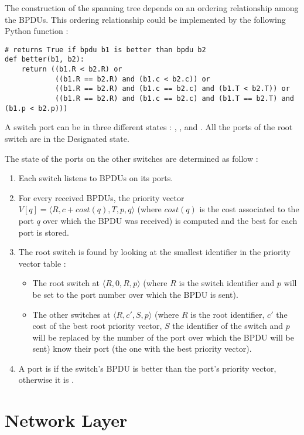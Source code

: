 The construction of the spanning tree depends on an ordering relationship among the BPDUs. This ordering relationship could be implemented by the following Python function :

\begin{verbatim}
# returns True if bpdu b1 is better than bpdu b2
def better(b1, b2):
    return ((b1.R < b2.R) or
            ((b1.R == b2.R) and (b1.c < b2.c)) or
            ((b1.R == b2.R) and (b1.c == b2.c) and (b1.T < b2.T)) or
            ((b1.R == b2.R) and (b1.c == b2.c) and (b1.T == b2.T) and (b1.p < b2.p)))
\end{verbatim}

A switch port can be in three different states : , , and . All the ports of the root switch are in the Designated state.

The state of the ports on the other switches are determined as follow :
\begin{enumerate}
\item Each switch listens to BPDUs on its ports.
\item For every received BPDUs, the priority vector $V[q] = \langle R, c + cost(q), T, p, q \rangle$ (where $cost(q)$ is the cost associated to the port $q$ over which the BPDU was received) is computed and the best for each port is stored.
\item The root switch is found by looking at the smallest identifier in the priority vector table :
	\begin{itemize}
	\item The root switch at $\langle R, 0, R, p \rangle$ (where $R$ is the switch identifier and $p$ will be set to the port number over which the BPDU is sent).
	\item The other switches at $\langle R, c', S, p \rangle$ (where $R$ is the root identifier, $c'$ the cost of the best root priority vector, $S$ the identifier of the switch and $p$ will be replaced by the number of the port over which the BPDU will be sent) know their  port (the one with the best priority vector).
	\end{itemize}
\item A port is  if the switch's BPDU is better than the port’s priority vector, otherwise it is .
\end{enumerate}

\section{Network Layer}

